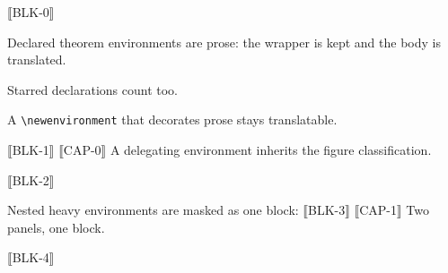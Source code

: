 ⟦BLK-0⟧

\begin{lemma}[Masking]
\label{lem:mask}
Declared theorem environments are prose: the wrapper is kept and the body is
translated.
\end{lemma}

\begin{remark}
Starred declarations count too.
\end{remark}

\begin{highlight}
A \verb|\newenvironment| that decorates prose stays translatable.
\end{highlight}

⟦BLK-1⟧
⟦CAP-0⟧ A delegating environment inherits the figure classification.

⟦BLK-2⟧

Nested heavy environments are masked as one block:
⟦BLK-3⟧
⟦CAP-1⟧ Two panels, one block.

⟦BLK-4⟧


